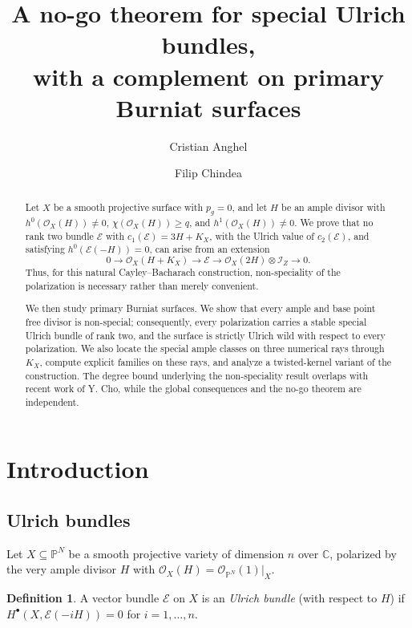 \documentclass{amsart}
\title[A no-go theorem for special Ulrich bundles]{A no-go theorem for special Ulrich bundles,\\ with a complement on primary Burniat surfaces}
\author{Cristian Anghel}
\author{Filip Chindea}
\theoremstyle{definition}
\newtheorem{definition}[theorem]{Definition}
\newcommand{\OO}{\mathcal{O}}
\newcommand{\EE}{\mathcal{E}}
\newcommand{\II}{\mathcal{I}}
\newcommand{\CC}{\mathbb{C}}
\newcommand{\PP}{\mathbb{P}}
\begin{document}
\begin{abstract}
Let $X$ be a smooth projective surface with $p_g=0$, and let $H$ be an ample divisor with $h^0(\OO_X(H))\neq0$, $\chi(\OO_X(H))\ge q$, and $h^1(\OO_X(H))\neq0$. We prove that no rank two bundle $\EE$ with $c_1(\EE)=3H+K_X$, with the Ulrich value of $c_2(\EE)$, and satisfying $h^0(\EE(-H))=0$, can arise from an extension
\[
0\longrightarrow \OO_X(H+K_X)\longrightarrow \EE\longrightarrow \OO_X(2H)\otimes\II_Z\longrightarrow0.
\]
Thus, for this natural Cayley--Bacharach construction, non-speciality of the polarization is necessary rather than merely convenient.

We then study primary Burniat surfaces. We show that every ample and base point free divisor is non-special; consequently, every polarization carries a stable special Ulrich bundle of rank two, and the surface is strictly Ulrich wild with respect to every polarization. We also locate the special ample classes on three numerical rays through $K_X$, compute explicit families on these rays, and analyze a twisted-kernel variant of the construction. The degree bound underlying the non-speciality result overlaps with recent work of Y. Cho, while the global consequences and the no-go theorem are independent.
\end{abstract}

\maketitle

\section{Introduction}\label{sec:intro}

\subsection{Ulrich bundles}\label{subsec:ulrich}
Let $X\subseteq\PP^N$ be a smooth projective variety of dimension $n$ over $\CC$, polarized by the very ample divisor $H$ with $\OO_X(H)=\OO_{\PP^N}(1)|_X$.

\begin{definition}\label{def:ulrich}
A vector bundle $\EE$ on $X$ is an \emph{Ulrich bundle} (with respect to $H$) if $H^\bullet(X,\EE(-iH))=0$ for $i=1,\dots,n$.
\end{definition}
\end{document}
